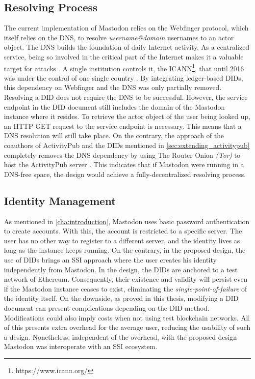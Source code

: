 \subsection{Resolving Process}
The current implementation of Mastodon relies on the Webfinger protocol, which itself relies on the DNS, to resolve \emph{username@domain} usernames to an actor object. The DNS builds the foundation of daily Internet activity. As a centralized service, being so involved in the critical part of the Internet makes it a valuable target for attacks \cite{carli2003security}. A single institution controls it, the ICANN\footnote{https://www.icann.org/}, that until 2016 was under the control of one single country \cite{lee_2016}. 
By integrating ledger-based DIDs, this dependency on Webfinger and the DNS was only partially removed. Resolving a DID does not require the DNS to be successful. However, the service endpoint in the DID document still includes the domain of the Mastodon instance where it resides. To retrieve the actor object of the user being looked up, an HTTP GET request to the service endpoint is necessary. This means that a DNS resolution will still take place. On the contrary, the approach of the coauthors of ActivityPub and the DIDs mentioned in \ref{sec:extending_activitypub} completely removes the DNS dependency by using The Router Onion \emph{(Tor)} to host the ActivityPub server \cite{webber_sporny_2017}. This indicates that if Mastodon were running in a DNS-free space, the design would achieve a fully-decentralized resolving process. 
 
\subsection{Identity Management} \label{ev:idm}

As mentioned in \ref{cha:introduction}, Mastodon uses basic password authentication to create accounts. With this, the account is restricted to a specific server. The user has no other way to register to a different server, and the identity lives as long as the instance keeps running. On the contrary, in the proposed design, the use of DIDs brings an SSI approach where the user creates his identity independently from Mastodon. In the design, the DIDs are anchored to a test network of Ethereum. Consequently, their existence and validity will persist even if the Mastodon instance ceases to exist, eliminating the \emph{single-point-of-failure} of the identity itself. On the downside, as proved in this thesis, modifying a DID document can present complications depending on the DID method. Modifications could also imply costs when not using test blockchain networks. All of this presents extra overhead for the average user, reducing the usability of such a design. Nonetheless, independent of the overhead, with the proposed design Mastodon was interoperate with an SSI ecosystem. 


